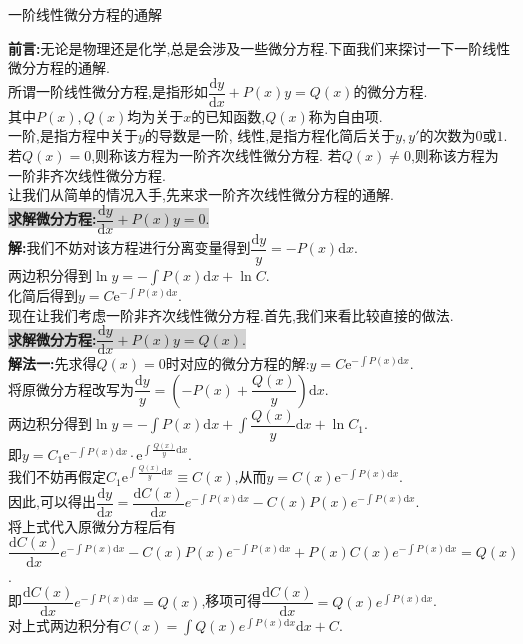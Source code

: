 \documentclass[a4paper,oneside]{ctexart}
\newcommand{\e}{\mathrm{e}}
\newcommand{\di}{\mathrm{d}}
\begin{document}
\pagestyle{empty}
\begin{center}\large 一阶线性微分方程的通解\end{center}
\textbf{前言:}无论是物理还是化学,总是会涉及一些微分方程.下面我们来探讨一下一阶线性微分方程的通解.\\
所谓一阶线性微分方程,是指形如$\dfrac{\di y}{\di x}+P(x)y=Q(x)$的微分方程.\\
其中$P(x),Q(x)$均为关于$x$的已知函数,$Q(x)$称为自由项.\\
一阶,是指方程中关于$y$的导数是一阶,
线性,是指方程化简后关于$y,y'$的次数为$0$或$1$.\\
若$Q(x)=0$,则称该方程为一阶齐次线性微分方程.
若$Q(x)\neq 0$,则称该方程为一阶非齐次线性微分方程.\\
让我们从简单的情况入手,先来求一阶齐次线性微分方程的通解.\\
\colorbox{lightgray}{\textbf{求解微分方程:}$\dfrac{\di y}{\di x}+P(x)y=0$.}\\
\textbf{解:}我们不妨对该方程进行分离变量得到$\dfrac{\di y}{y}=-P(x)\di x$.\\
两边积分得到$\ln{y}=-\int{P(x)\di x}+\ln{C}$.\\
化简后得到$y=C\e^{-\int{P(x)\di x}}$.\\
现在让我们考虑一阶非齐次线性微分方程.首先,我们来看比较直接的做法.\\
\colorbox{lightgray}{\textbf{求解微分方程:}$\dfrac{\di y}{\di x}+P(x)y=Q(x)$.}\\
\textbf{解法一:}先求得$Q(x)=0$时对应的微分方程的解:$y=C\e^{-\int{P(x)\di x}}$.\\
将原微分方程改写为$\dfrac{\di y}{y}=\left(-P(x)+\dfrac{Q(x)}{y}\right)\di x$.\\
两边积分得到$\ln{y}=-\int{P(x)\di x}+\int{\dfrac{Q(x)}{y}\di x}+\ln{C_1}$.\\
即$y=C_1\e^{-\int{P(x)\di x}}\cdot\e^{\int{\frac{Q(x)}{y}\di x}}$.\\
我们不妨再假定$C_1\e^{\int{\frac{Q(x)}{y}\di x}}\equiv C(x)$,从而$y=C(x)\e^{-\int{P(x)\di x}}$.\\
因此,可以得出$\dfrac{\di y}{\di x}=\dfrac{\di C(x)}{\di x}e^{-\int{P(x)\di x}}-C(x)P(x)e^{-\int{P(x)\di x}}$.\\
将上式代入原微分方程后有$\dfrac{\di C(x)}{\di x}e^{-\int{P(x)\di x}}-C(x)P(x)e^{-\int{P(x)\di x}}+P(x)C(x)e^{-\int{P(x)\di x}}=Q(x)$.\\
即$\dfrac{\di C(x)}{\di x}e^{-\int{P(x)\di x}}=Q(x)$,移项可得$\dfrac{\di C(x)}{\di x}=Q(x)e^{\int{P(x)\di x}}$.\\
对上式两边积分有$C(x)=\int{Q(x)e^{\int{P(x)\di x}}\di x}+C$.\\
\end{document}
